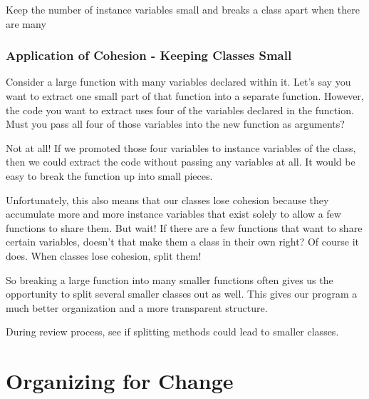 \begin{marker}
Keep the number of instance variables small and breaks a class apart when there are many
\end{marker}

\subsubsection{Application of Cohesion - Keeping Classes Small}

Consider a large function with many variables declared within it. Let’s say you
want to extract one small part of that function into a separate function. However, the code you want to extract uses four of the variables declared in the function. Must you pass all four of those variables into the new function as arguments?

Not at all! If we promoted those four variables to instance variables of the class, then we could extract the code without passing any variables at all. It would be easy to break the function up into small pieces.

Unfortunately, this also means that our classes lose cohesion because they accumulate more and more instance variables that exist solely to allow a few functions to share them. But wait! If there are a few functions that want to share certain variables, doesn't that make them a class in their own right? Of course it does. When classes lose cohesion, split them!

So breaking a large function into many smaller functions often gives us the opportunity to split several smaller classes out as well. This gives our program a much better organization and a more transparent structure.

\begin{marker}
During review process, see if splitting methods could lead to smaller classes.
\end{marker}

\section{Organizing for Change}